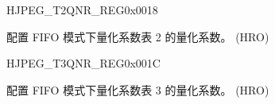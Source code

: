 \begin{register}{H}{JPEG\_T2QNR\_REG}{0x0018}\label{regdesc:JPEGT2QNRREG}
%
\regnewline%
\begin{regdesc}\begin{reglist}
\label{fielddesc:JPEGT2QNRVAL}\item [JPEG\_T2\_QNR\_VAL] 配置 FIFO 模式下量化系数表 2 的量化系数。 (HRO)
\end{reglist}\end{regdesc}
\end{register}


\begin{register}{H}{JPEG\_T3QNR\_REG}{0x001C}\label{regdesc:JPEGT3QNRREG}
%
\regnewline%
\begin{regdesc}\begin{reglist}
\label{fielddesc:JPEGT3QNRVAL}\item [JPEG\_T3\_QNR\_VAL] 配置 FIFO 模式下量化系数表 3 的量化系数。 (HRO)
\end{reglist}\end{regdesc}
\end{register}


